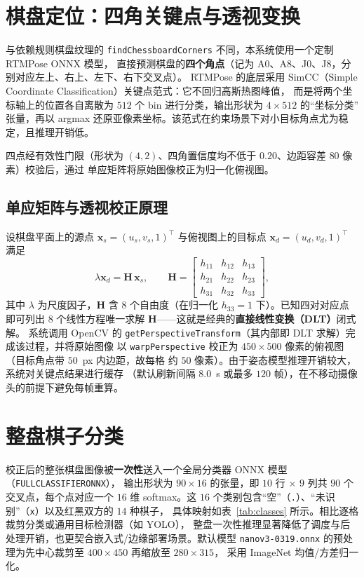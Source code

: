 \documentclass[UTF8, a4paper, 11pt, openany]{ctexbook}
\renewcommand{\_}{\textunderscore\allowbreak}
\begin{document}
\section{棋盘定位：四角关键点与透视变换}
\label{sec:locate}
与依赖规则棋盘纹理的 \texttt{findChessboardCorners} 不同，本系统使用一个定制 RTMPose ONNX 模型，
直接预测棋盘的\textbf{四个角点}（记为 A0、A8、J0、J8，分别对应左上、右上、左下、右下交叉点）\cite{jiang2023rtmpose,li2022simcc}。
RTMPose 的底层采用 SimCC（Simple Coordinate Classification）关键点范式：它不回归高斯热图峰值，
而是将两个坐标轴上的位置各自离散为 $512$ 个 bin 进行分类，输出形状为 $4\times512$ 的“坐标分类”
张量，再以 argmax 还原亚像素坐标。该范式在约束场景下对小目标角点尤为稳定，且推理开销低。

四点经有效性门限（形状为 $(4,2)$、四角置信度均不低于 $0.20$、边距容差 $80$ 像素）校验后，通过
单应矩阵将原始图像校正为归一化俯视图。

\subsection{单应矩阵与透视校正原理}
设棋盘平面上的源点 $\mathbf{x}_s=(u_s,v_s,1)^{\top}$ 与俯视图上的目标点
$\mathbf{x}_d=(u_d,v_d,1)^{\top}$ 满足
\begin{equation}
\label{eq:homo}
\lambda \mathbf{x}_d = \mathbf{H}\,\mathbf{x}_s,\qquad
\mathbf{H}=
\begin{bmatrix}
h_{11} & h_{12} & h_{13}\\
h_{21} & h_{22} & h_{23}\\
h_{31} & h_{32} & h_{33}
\end{bmatrix},
\end{equation}
其中 $\lambda$ 为尺度因子，$\mathbf{H}$ 含 $8$ 个自由度（在归一化 $h_{33}=1$ 下）。已知四对对应点
即可列出 $8$ 个线性方程唯一求解 $\mathbf{H}$——这就是经典的\textbf{直接线性变换（DLT）}闭式解。
系统调用 OpenCV 的 \texttt{getPerspectiveTransform}（其内部即 DLT 求解）完成该过程，并将原始图像
以 \texttt{warpPerspective} 校正为 $450\times500$ 像素的俯视图（目标角点带 $50$~px 内边距，故每格
约 $50$ 像素）\cite{hartley2004mvp}。由于姿态模型推理开销较大，系统对关键点结果进行缓存
（默认刷新间隔 $8.0$~s 或最多 $120$ 帧），在不移动摄像头的前提下避免每帧重算。

\section{整盘棋子分类}
\label{sec:classify}
校正后的整张棋盘图像被\textbf{一次性}送入一个全局分类器 ONNX 模型（\texttt{FULL\_CLASSIFIER\_ONNX}），
输出形状为 $90\times16$ 的张量，即 $10$ 行 $\times$ $9$ 列共 $90$ 个交叉点，每个点对应一个 $16$ 维
softmax。这 $16$ 个类别包含“空”（\texttt{.}）、“未识别”（\texttt{x}）以及红黑双方的 $14$ 种棋子，
具体映射如表~\ref{tab:classes} 所示。相比逐格裁剪分类或通用目标检测器（如 YOLO\cite{redmon2016yolo}），
整盘一次性推理显著降低了调度与后处理开销，也更契合嵌入式/边缘部署场景。默认模型
\texttt{nano\_v3-0319.onnx} 的预处理为先中心裁剪至 $400\times450$ 再缩放至 $280\times315$，
采用 ImageNet 均值/方差归一化\cite{deng2009imagenet,krizhevsky2012alexnet}。
\end{document}
